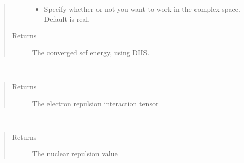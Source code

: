 \documentclass[letterpaper,10pt,english]{sphinxmanual}
\begin{document}
\begin{fulllineitems}
\begin{fulllineitems}
\begin{quote}
\begin{description}
\begin{itemize}
\item {} 
 \textendash{} Specify whether or not you want to work in the complex space. Default is real.

\end{itemize}

\item[{Returns}] \leavevmode
The converged scf energy, using DIIS.

\end{description}\end{quote}

\end{fulllineitems}


\begin{fulllineitems}
\label{\detokenize{RHF:ghf.RHF.RHF.get_two_e}}~\begin{quote}\begin{description}
\item[{Returns}] \leavevmode
The electron repulsion interaction tensor

\end{description}\end{quote}

\end{fulllineitems}


\begin{fulllineitems}
\label{\detokenize{RHF:ghf.RHF.RHF.nuc_rep}}~\begin{quote}\begin{description}
\item[{Returns}] \leavevmode
The nuclear repulsion value

\end{description}\end{quote}

\end{fulllineitems}



\end{fulllineitems}
\end{document}
